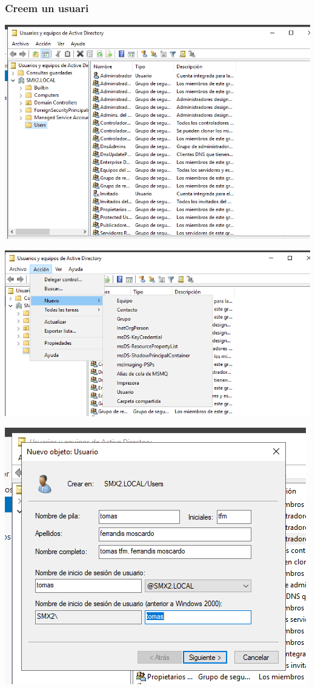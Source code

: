 \documentclass[
  a4paper,
]{article}
\begin{document}
\subsubsection{Creem un usuari}\label{creem-un-usuari}

\includegraphics{png/usuaris2.png}

\includegraphics{png/usuaris3.png}

\includegraphics{png/usuaris4.png}
\end{document}
